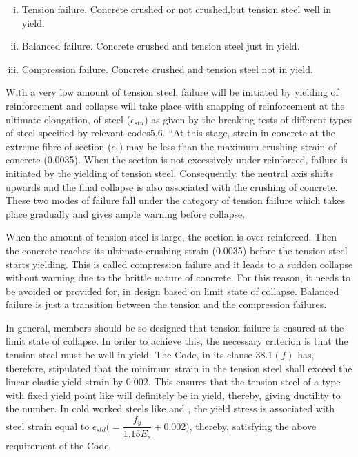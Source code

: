 \begin{enumerate}[(i)]
\item Tension failure. Concrete crushed or not crushed,but tension steel well in yield.
\item Balanced failure. Concrete crushed and tension steel just in yield.
\item Compression failure. Concrete crushed and tension steel not in yield.
\end{enumerate}
With a very low amount of tension steel, failure will be initiated by
yielding of reinforcement and collapse will take place with snapping of
reinforcement at the ultimate elongation, of steel ($\epsilon_{stu}$) as
given by the breaking tests of different types of steel speciﬁed by
relevant codes5,6. “At this stage, strain in concrete at the extreme
fibre of section ($\epsilon_1$) may be less than the maximum crushing
strain of concrete (0.0035). When the section is not excessively
under-reinforced, failure is initiated by the yielding of tension steel.
Consequently, the neutral axis shifts upwards and the final collapse is
also associated with the crushing of concrete. These two modes of failure
fall under the category of tension failure which takes place gradually
and gives ample warning before collapse.

When the amount of tension steel is large, the section is over-reinforced.
Then the concrete reaches its ultimate crushing strain (0.0035)
before the tension steel starts yielding. This is called compression
failure and it leads to a sudden collapse without warning due to the
brittle nature of concrete. For this reason, it needs to be avoided or
provided for, in design based on limit state of collapse. Balanced
failure is just a transition between the tension and the compression
failures.

In general, members should be so designed that tension failure
is ensured at the limit state of collapse. In order to achieve this, the
necessary criterion is that the tension steel must be well in yield. The
Code, in its clause 38.1$(f)$ has, therefore, stipulated that the minimum
strain in the tension steel shall exceed the linear elastic yield strain
by 0.002. This ensures that the tension steel of a type with fixed yield
point like {\fetwofivezero} will deﬁnitely be in yield, thereby, giving
ductility to the number. In cold worked steels like {\fefouronefive} and
{\fefivezerozero}, the yield stress is associated with steel strain equal to              
$\epsilon_{std}\Bigg(=\dfrac{f_y}{1.15 E_s}+0.002\Bigg)$, thereby,
satisfying the above requirement of the Code.

